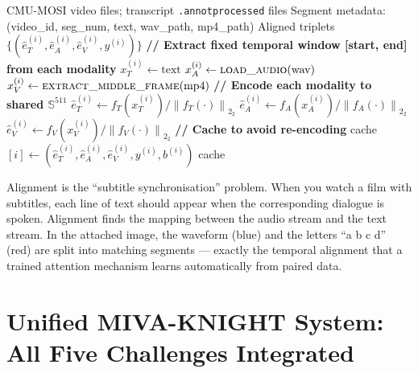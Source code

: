 \documentclass[12pt,a4paper]{article}
\theoremstyle{definition}
\theoremstyle{plain}
\theoremstyle{remark}
\newcommand{\Sph}{\mathbb{S}}
\newcommand{\Norm}[1]{\left\|#1\right\|_2}
\begin{document}
\begin{algorithm}[H]
\caption{CMU-MOSI Segment-Level Temporal Alignment (Pipeline E)}
\label{alg:align_mosi}
\begin{algorithmic}[1]
\Require CMU-MOSI video files; transcript \texttt{.annotprocessed} files
\Require Segment metadata: (video\_id, seg\_num, text, wav\_path, mp4\_path)
\Ensure Aligned triplets $\{(\hat{e}_T^{(i)}, \hat{e}_A^{(i)}, \hat{e}_V^{(i)}, y^{(i)})\}$
  \State \textbf{// Extract fixed temporal window [start, end] from each modality}
  \State $x_T^{(i)} \gets \text{text}$ 
  \State $x_A^{(i)} \gets \textsc{load\_audio}(\text{wav})$ 
  \State $x_V^{(i)} \gets \textsc{extract\_middle\_frame}(\text{mp4})$ 
  \State \textbf{// Encode each modality to shared $\Sph^{511}$}
  \State $\hat{e}_T^{(i)} \gets f_T(x_T^{(i)}) / \Norm{f_T(\cdot)}_2$
  \State $\hat{e}_A^{(i)} \gets f_A(x_A^{(i)}) / \Norm{f_A(\cdot)}_2$
  \State $\hat{e}_V^{(i)} \gets f_V(x_V^{(i)}) / \Norm{f_V(\cdot)}_2$
  \State \textbf{// Cache to avoid re-encoding}
  \State cache$[i] \gets (\hat{e}_T^{(i)}, \hat{e}_A^{(i)}, \hat{e}_V^{(i)}, y^{(i)}, b^{(i)})$
\EndFor
\State \Return cache 
\end{algorithmic}
\end{algorithm}

\begin{tcolorbox}[laymanbox]
Alignment is the ``subtitle synchronisation'' problem. When you watch a film with subtitles, each line of text should appear when the corresponding dialogue is spoken. Alignment finds the mapping between the audio stream and the text stream. In the attached image, the waveform (blue) and the letters ``a b c d'' (red) are split into matching segments — exactly the temporal alignment that a trained attention mechanism learns automatically from paired data.
\end{tcolorbox}

\newpage
\section{Unified MIVA-KNIGHT System: All Five Challenges Integrated}
\label{sec:unified}
\end{document}
